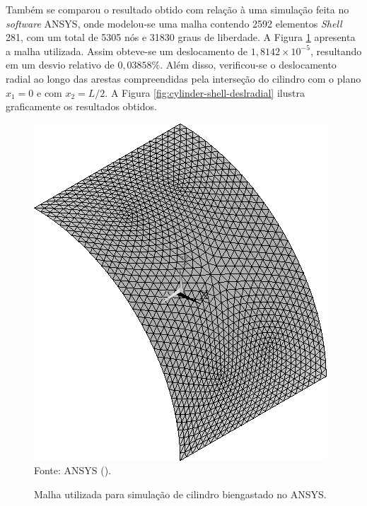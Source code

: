 Também se comparou o resultado obtido com relação à uma simulação feita no \textit{software} ANSYS, onde modelou-se uma malha contendo 2592 elementos \textit{Shell} 281, com um total de 5305 nós e 31830 graus de liberdade. A Figura \ref{fig:clampedCylinderANSYS} apresenta a malha utilizada. Assim obteve-se um deslocamento de $1,8142\times10^{-5}$, resultando em um desvio relativo de $0,03858\%$. Além disso, verificou-se o deslocamento radial ao longo das arestas compreendidas pela interseção do cilindro com o plano $x_1=0$ e com $x_2=L/2$. A Figura \ref{fig:cylinder-shell-deslradial} ilustra graficamente os resultados obtidos.

\begin{figure}[h!]
    \centering
    \caption{Malha utilizada para simulação de cilindro biengastado no ANSYS.}
    \includegraphics[width=0.35\linewidth]{Figuras/cylinder-shell/ANSYS.png}
    \\Fonte: ANSYS (\the\year).
    \label{fig:clampedCylinderANSYS}
\end{figure}

